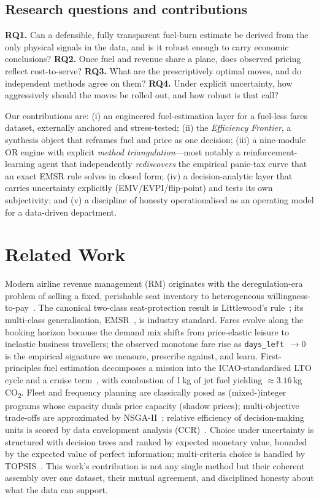 \documentclass[conference]{IEEEtran}
\newcommand{\co}{\mbox{CO\textsubscript{2}}}
\begin{document}
\subsection{Research questions and contributions}
\textbf{RQ1.} Can a defensible, fully transparent fuel-burn estimate be derived from the only physical signals in the data, and is it robust enough to carry economic conclusions?
\textbf{RQ2.} Once fuel and revenue share a plane, does observed pricing reflect cost-to-serve?
\textbf{RQ3.} What are the prescriptively optimal moves, and do independent methods agree on them?
\textbf{RQ4.} Under explicit uncertainty, how aggressively should the moves be rolled out, and how robust is that call?

Our contributions are: (i) an engineered fuel-estimation layer for a fuel-less fares dataset, externally anchored and stress-tested; (ii) the \emph{Efficiency Frontier}, a synthesis object that reframes fuel and price as one decision; (iii) a nine-module OR engine with explicit \emph{method triangulation}---most notably a reinforcement-learning agent that independently \emph{rediscovers} the empirical panic-tax curve that an exact EMSR rule solves in closed form; (iv) a decision-analytic layer that carries uncertainty explicitly (EMV/EVPI/flip-point) and tests its own subjectivity; and (v) a discipline of honesty operationalised as an operating model for a data-driven department.

\section{Related Work}
Modern airline revenue management (RM) originates with the deregulation-era problem of selling a fixed, perishable seat inventory to heterogeneous willingness-to-pay~\cite{talluri}. The canonical two-class seat-protection result is Littlewood's rule~\cite{littlewood}; its multi-class generalisation, EMSR~\cite{belobaba}, is industry standard. Fares evolve along the booking horizon because the demand mix shifts from price-elastic leisure to inelastic business travellers; the observed monotone fare rise as \texttt{days\_left}~$\!\to\!0$ is the empirical signature we measure, prescribe against, and learn. First-principles fuel estimation decomposes a mission into the ICAO-standardised LTO cycle and a cruise term~\cite{icao}, with combustion of 1\,kg of jet fuel yielding $\approx 3.16$\,kg \co{}. Fleet and frequency planning are classically posed as (mixed-)integer programs whose capacity duals price capacity (shadow prices); multi-objective trade-offs are approximated by NSGA-II~\cite{nsga2}; relative efficiency of decision-making units is scored by data envelopment analysis (CCR)~\cite{ccr}. Choice under uncertainty is structured with decision trees and ranked by expected monetary value, bounded by the expected value of perfect information; multi-criteria choice is handled by TOPSIS~\cite{topsis}. This work's contribution is not any single method but their coherent assembly over one dataset, their mutual agreement, and disciplined honesty about what the data can support.
\end{document}

